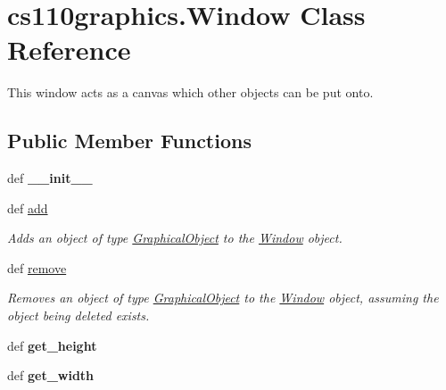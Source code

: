 \hypertarget{classcs110graphics_1_1Window}{
\section{cs110graphics.Window Class Reference}
\label{classcs110graphics_1_1Window}
}


This window acts as a canvas which other objects can be put onto.  
\subsection*{Public Member Functions}
\begin{DoxyCompactItemize}
\item 
\hypertarget{classcs110graphics_1_1Window_af926549e3d731847886302fa390f2863}{
def {\bfseries \_\-\_\-init\_\-\_\-}}
\label{classcs110graphics_1_1Window_af926549e3d731847886302fa390f2863}

\item 
def \hyperlink{classcs110graphics_1_1Window_a34064de02d5149841a23764e78085d18}{add}
\begin{DoxyCompactList}\small\item\em Adds an object of type \hyperlink{classcs110graphics_1_1GraphicalObject}{GraphicalObject} to the \hyperlink{classcs110graphics_1_1Window}{Window} object. \item\end{DoxyCompactList}\item 
def \hyperlink{classcs110graphics_1_1Window_a14aba875d32f8a70a0c5a80ac3f18a92}{remove}
\begin{DoxyCompactList}\small\item\em Removes an object of type \hyperlink{classcs110graphics_1_1GraphicalObject}{GraphicalObject} to the \hyperlink{classcs110graphics_1_1Window}{Window} object, assuming the object being deleted exists. \item\end{DoxyCompactList}\item 
\hypertarget{classcs110graphics_1_1Window_a2ab7070110bd58c95e8f29c10d71c7cc}{
def {\bfseries get\_\-height}}
\label{classcs110graphics_1_1Window_a2ab7070110bd58c95e8f29c10d71c7cc}

\item 
\hypertarget{classcs110graphics_1_1Window_a41d27bb09f5033f0596af9f1a3a9b519}{
def {\bfseries get\_\-width}}
\label{classcs110graphics_1_1Window_a41d27bb09f5033f0596af9f1a3a9b519}


\end{DoxyCompactItemize}
